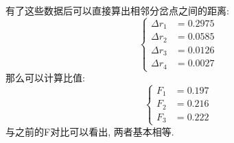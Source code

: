 \documentclass[a4paper,zihao=5,UTF8]{ctexart}
\begin{document}
    \par 
    有了这些数据后可以直接算出相邻分岔点之间的距离:
    \begin{equation}
        \left\{
        \begin{aligned}
            \Delta r_1 &= 0.2975 \\
            \Delta r_2 &= 0.0585 \\
            \Delta r_3 &= 0.0126 \\
            \Delta r_4 &= 0.0027
        \end{aligned}
        \right.
    \end{equation}
    那么可以计算比值:
    \begin{equation}
        \left\{
        \begin{aligned}
            F_1 &= 0.197\\
            F_2 &= 0.216\\
            F_3 &= 0.222
        \end{aligned}
        \right.
    \end{equation}
    与之前的F对比可以看出, 两者基本相等.
\end{document}
